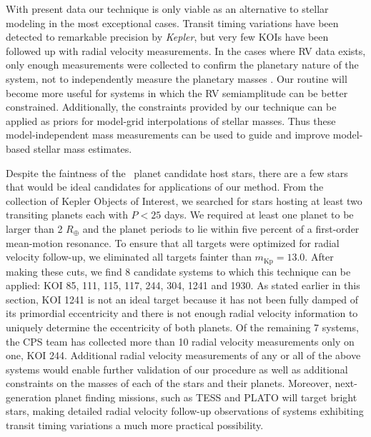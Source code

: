 With present data our technique is only viable as an alternative to stellar modeling in the most exceptional cases. Transit timing variations have been detected to remarkable precision by \textit{Kepler}, but very few KOIs have been followed up with radial velocity measurements. In the cases where RV data exists, only enough measurements were collected to confirm the planetary nature of the system, not to independently measure the planetary masses \citep{Holman10}. Our routine will become more useful for systems in which the RV semiamplitude can be better constrained. Additionally, the constraints provided by our technique can be applied as priors for model-grid interpolations of stellar masses. Thus these model-independent mass measurements can be used to guide and improve model-based stellar mass estimates.

Despite the faintness of the \kep\ planet candidate host stars, there are a few stars that would be ideal candidates for applications of our method. From the collection of Kepler Objects of Interest, we searched for stars hosting at least two transiting planets each with $P < 25$ days. We required at least one planet to be larger than 2 $R_\oplus$ and the planet periods to lie within five percent of a first-order mean-motion resonance. To ensure that all targets were optimized for radial velocity follow-up, we eliminated all targets fainter than $m_{\textrm{Kp}} = 13.0$. After making these cuts, we find 8 candidate systems to which this technique can be applied: KOI 85, 111, 115, 117, 244, 304, 1241 and 1930. As stated earlier in this section, KOI 1241 is not an ideal target because it has not been fully damped of its primordial eccentricity and there is not enough radial velocity information to uniquely determine the eccentricity of both planets. Of the remaining 7 systems, the CPS team has collected more than 10 radial velocity measurements only on one, KOI 244. Additional radial velocity measurements of any or all of the above systems would enable further validation of our procedure as well as additional constraints on the masses of each of the stars and their planets. Moreover, next-generation planet finding missions, such as TESS \citep{Brown08} and PLATO \citep{Catala10} will target bright stars, making detailed radial velocity follow-up observations of systems exhibiting transit timing variations a much more practical possibility. 



